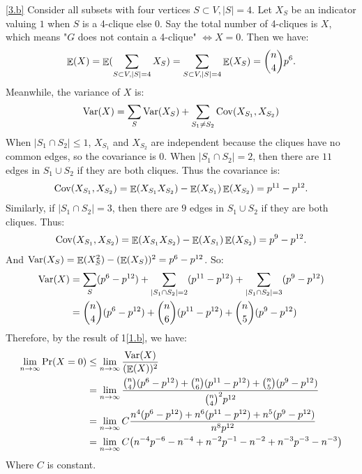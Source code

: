 \documentclass{homework}
\begin{document}
\begin{solution}
\ref{3.b}
Consider all subsets with four vertices $S\subset V,|S|=4$. Let $X_S$ be an indicator valuing $1$ when $S$ is a 4-clique else $0$. Say the total number of 4-cliques is $X$, which means "$G$ does not contain a 4-clique" $\iff X=0$. Then we have:
\begin{align*}
  \mathop{\mathbb{E}}\displaylimits(X) = \mathop{\mathbb{E}}\displaylimits(\sum_{S\subset V,|S|=4} X_S) = \sum_{S\subset V,|S|=4} \mathop{\mathbb{E}}\displaylimits(X_S) = \binom{n}{4}p^6.
\end{align*}
Meanwhile, the variance of $X$ is:
\begin{align*}
  \mathop{\mathrm{Var}}\displaylimits(X) = \sum_{S} \mathop{\mathrm{Var}}\displaylimits(X_S) + \sum_{S_1\ne S_2}\mathrm{Cov}(X_{S_1},X_{S_2}) 
\end{align*}
When $|S_1\cap S_2|\le 1$, $X_{S_1}$ and $X_{S_2}$ are independent because the cliques have no common edges, so the covariance is $0$. When $|S_1\cap S_2| = 2$, then there are $11$ edges in $S_1\cup S_2$ if they are both cliques. Thus the covariance is:
\begin{align*}
  \mathrm{Cov}(X_{S_1},X_{S_2}) = \mathop{\mathbb{E}}\displaylimits(X_{S_1}X_{S_2}) - \mathop{\mathbb{E}}\displaylimits(X_{S_1})\mathop{\mathbb{E}}\displaylimits(X_{S_2}) = p^{11} - p^{12}.
\end{align*}
Similarly, if $|S_1\cap S_2| = 3$, then there are $9$ edges in $S_1\cup S_2$ if they are both cliques. Thus:
\begin{align*}
  \mathrm{Cov}(X_{S_1},X_{S_2}) = \mathop{\mathbb{E}}\displaylimits(X_{S_1}X_{S_2}) - \mathop{\mathbb{E}}\displaylimits(X_{S_1})\mathop{\mathbb{E}}\displaylimits(X_{S_2}) = p^9 - p^{12}.
\end{align*}
And $\mathop{\mathrm{Var}}\displaylimits(X_S) = \mathop{\mathbb{E}}\displaylimits(X_S^2)-(\mathop{\mathbb{E}}\displaylimits(X_S))^2 = p^6-p^{12}$. So:
\begin{align*}
  \mathop{\mathrm{Var}}\displaylimits(X) &= \sum_S (p^6 - p^{12}) + \sum_{|S_1\cap S_2|=2} (p^{11} - p^{12}) + \sum_{|S_1\cap S_2|=3} (p^9 - p^{12}) \\
  &= \binom{n}{4}(p^6 - p^{12}) + \binom{n}{6}(p^{11} - p^{12}) + \binom{n}{5}(p^9 - p^{12})
\end{align*}
Therefore, by the result of 1\ref{1.b}, we have:
\begin{align*}
  \lim_{n \to \infty}\Pr(X=0) &\le \lim_{n \to \infty}\frac{\mathop{\mathrm{Var}}\displaylimits(X)}{(\mathop{\mathbb{E}}\displaylimits(X))^2}\\
  &= \lim_{n \to \infty}\frac{\binom{n}{4}(p^6 - p^{12}) + \binom{n}{6}(p^{11} - p^{12}) + \binom{n}{5}(p^9 - p^{12})}{{\binom{n}{4}}^2 p^{12}}\\
  &= \lim_{n \to \infty}C\frac{n^4(p^6 - p^{12}) + n^6(p^{11} - p^{12}) + n^5(p^9 - p^{12})}{n^8 p^{12}}\\
  &= \lim_{n \to \infty}C\bigl( n^{-4}p^{-6}- n^{-4} + n^{-2}p^{-1} - n^{-2} + n^{-3}p^{-3} - n^{-3} \bigr)\\
\end{align*}
Where $C$ is constant.


\end{solution}
\end{document}

